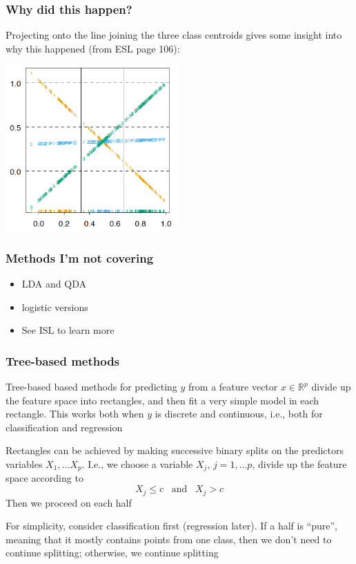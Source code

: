 \documentclass[mathserif]{beamer}
\def\R{\mathds{R}}
\def\red{\color[rgb]{0.8,0,0}}
\begin{document}
\begin{frame}
\frametitle{Why did this happen?}
Projecting onto the line joining the three class centroids gives some insight into 
why this happened (from ESL page 106):
\begin{center}
\includegraphics[width=2.6in]{why.png}
\end{center}
\end{frame}

\begin{frame}
\frametitle{Methods I'm not covering}
\begin{itemize}
\item LDA and QDA
\item logistic versions
\item See ISL to learn more
\end{itemize}
\end{frame}


\begin{frame}
\frametitle{Tree-based methods}
{\red Tree-based based} methods for predicting $y$ from a feature
vector $x \in \R^p$ divide up the feature space into rectangles,
and then fit a very simple model in each rectangle. This works
both when $y$ is discrete and continuous, i.e., both for 
{\red classification} and {\red regression}

\bigskip
Rectangles can be achieved by making successive 
binary splits on the predictors variables $X_1,\ldots X_p$. I.e.,
we choose a variable $X_j$, $j=1,\ldots p$, {\red divide} up the 
feature space according to 
$$X_j \leq c \;\;\;\text{and}\;\;\; X_j > c$$ Then we proceed
on each half

\bigskip For simplicity, consider classification first
(regression later). If a half is ``pure'', meaning that it
mostly contains points from one class, then we
don't need to continue splitting; otherwise, we continue splitting
\end{frame}
\end{document}
